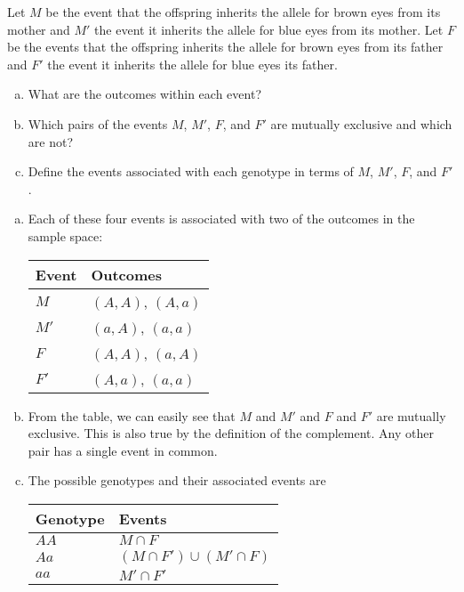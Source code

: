 \documentclass[addpoints,answers]{exam}
\begin{document}
\begin{questions}
    \question
    Let $M$ be the event that the offspring inherits the allele for brown eyes from its mother and $M'$ the event it inherits the allele for blue eyes from its mother. Let  $F$ be the events that the offspring inherits the allele for brown eyes from its father and $F'$ the event it inherits the allele for blue eyes its father.

  \begin{enumerate}[a)]
  \item What are the outcomes within each event?
  \item Which pairs of the events $M$, $M'$, $F$, and $F'$ are mutually exclusive and which are not?
  \item Define the events associated with each genotype in terms of $M$, $M'$, $F$, and $F'$.
  \end{enumerate}
  
    \begin{solution}
    \begin{enumerate}[a)]
    \item Each of these four events is associated with two of the outcomes in the sample space:
      \begin{center}
        \begin{tabular}{ll}
          Event & Outcomes\\
          \hline
          $M$ & $(A,A)$, $(A,a)$\\
          $M'$ & $(a,A)$, $(a,a)$\\
          $F$ & $(A,A)$, $(a,A)$\\
          $F'$ & $(A,a)$, $(a,a)$
        \end{tabular}
      \end{center}
    \item From the table, we can easily see that $M$ and $M'$ and $F$ and $F'$ are mutually exclusive. This is also true by the definition of the complement. Any other pair has a single event in common. 
      \item The possible genotypes and their associated events are
      \begin{center}
        \begin{tabular}{ll}
          Genotype & Events\\
          \hline
          $AA$ & $M \cap F$\\
          $Aa$ & $(M \cap F') \cup (M' \cap F)$\\
          $aa$ & $M' \cap F'$\\
        \end{tabular}
      \end{center}
    \end{enumerate}
    \end{solution}
    

\end{questions}
\end{document}
